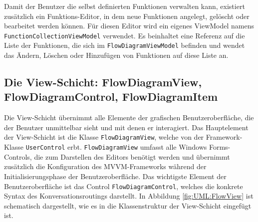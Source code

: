 \newline
Damit der Benutzer die selbst definierten Funktionen verwalten kann, existiert zusätzlich ein Funktions-Editor, in dem neue Funktionen angelegt, gelöscht oder bearbeitet werden können. Für diesen Editor wird ein eigenes ViewModel namens \texttt{FunctionCollectionViewModel} verwendet. Es beinhaltet eine Referenz auf die Liste der Funktionen, die sich im \texttt{FlowDiagramViewModel} befinden und wendet das Ändern, Löschen oder Hinzufügen von Funktionen auf diese Liste an.

\subsection[Die View-Schicht]{Die View-Schicht: FlowDiagramView, FlowDiagramControl, FlowDiagramItem}
Die View-Schicht übernimmt alle Elemente der grafischen Benutzeroberfläche, die der Benutzer unmittelbar sieht und mit denen er interagiert. Das Hauptelement der View-Schicht ist die Klasse \texttt{FlowDiagramView}, welche von der Framework-Klasse \texttt{UserControl} erbt. \texttt{FlowDiagramView} umfasst alle Windows Forms-Controls, die zum Darstellen des Editors benötigt werden und übernimmt zusätzlich die Konfiguration des MVVM-Frameworks während der Initialisierungsphase der Be\-nutz\-er\-ober\-fläche.
\newline  
Das wichtigste Element der Benutzeroberfläche ist das Control \texttt{Flow\-Dia\-gram\-Con\-trol}, welches  die konkrete Syntax des Konversationsroutings darstellt. In Abbildung \ref{fig:UML:FlowView} ist schematisch dargestellt, wie es in die Klassenstruktur der View-Schicht eingefügt ist. 

